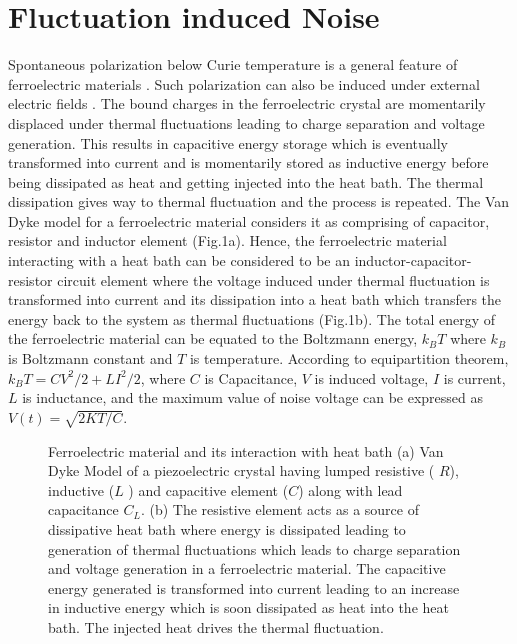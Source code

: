 \documentclass[12pt,column,showpacs,pre,preprintnumbers,amsmath,amssymb,aps,standalone]{revtex4-2}
\begin{document}
\section{Fluctuation induced Noise}
Spontaneous polarization below Curie temperature is a general feature of ferroelectric materials \cite{17}. Such polarization can also be induced under external electric fields  \cite{18}. The bound charges in the ferroelectric crystal are momentarily displaced under thermal fluctuations leading to charge separation and voltage generation. This results in capacitive energy storage which is eventually transformed into current and is momentarily stored as inductive energy before being dissipated as heat and getting injected into the heat bath. The thermal dissipation gives way to thermal fluctuation and the process is repeated.
The Van Dyke model for a ferroelectric material considers it as comprising of capacitor, resistor and inductor element (Fig.1a). Hence, the ferroelectric material interacting with a heat bath can be considered to be an inductor-capacitor-resistor circuit element where the voltage induced under thermal fluctuation is transformed into current and its dissipation into a heat bath which transfers the energy back to the system as thermal fluctuations (Fig.1b). The total energy of the ferroelectric material can be equated to the Boltzmann energy, $k_BT$ where $k_B$ is Boltzmann constant and $T$ is temperature. According to equipartition theorem, $k_BT=CV^2/2+LI^2/2$, where $C$ is Capacitance, $V$ is induced voltage, $I$ is current, $L$ is inductance, and the maximum value of noise voltage can be expressed as $V(t)=\sqrt{2KT/C}$.
\begin{figure}[h!]
	\centering {} 
	\label{fig1}
	\caption{\small Ferroelectric material and its interaction with heat bath (a) Van Dyke Model of a piezoelectric crystal having lumped resistive ( $ R $), inductive ($ L $ ) and capacitive element ($ C $) along with lead capacitance $ C_L $. (b) The resistive element acts as a source of dissipative heat bath where energy is dissipated leading to generation of thermal fluctuations which leads to charge separation and voltage generation in a ferroelectric material. The capacitive energy generated is transformed into current leading to an increase in inductive energy which is soon dissipated as heat into the heat bath. The injected heat drives the thermal fluctuation.}
\end{figure}
\end{document}
